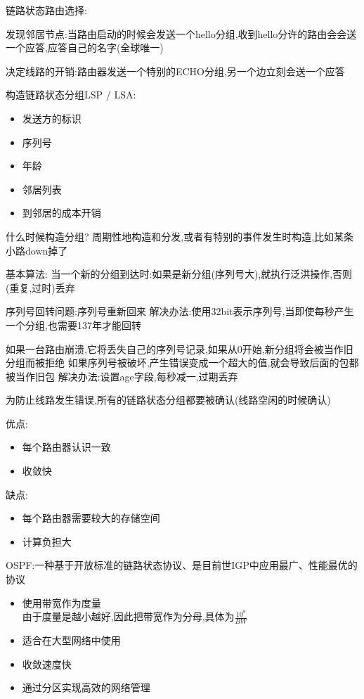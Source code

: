 \documentclass[UTF8,a4paper]{ctexart}
\begin{document}
链路状态路由选择:

发现邻居节点:当路由启动的时候会发送一个hello分组,收到hello分许的路由会会送一个应答,应答自己的名字(全球唯一)

决定线路的开销:路由器发送一个特别的ECHO分组,另一个边立刻会送一个应答

构造链路状态分组LSP / LSA:
\begin{itemize}
  \item 发送方的标识
  \item 序列号
  \item 年龄
  \item 邻居列表
  \item 到邻居的成本开销
\end{itemize}

什么时候构造分组?
周期性地构造和分发,或者有特别的事件发生时构造,比如某条小路down掉了

基本算法:
当一个新的分组到达时:如果是新分组(序列号大),就执行泛洪操作,否则(重复,过时)丢弃

序列号回转问题:序列号重新回来
解决办法:使用32bit表示序列号,当即使每秒产生一个分组,也需要137年才能回转

如果一台路由崩溃,它将丢失自己的序列号记录,如果从0开始,新分组将会被当作旧分组而被拒绝
如果序列号被破坏,产生错误变成一个超大的值,就会导致后面的包都被当作旧包
解决办法:设置age字段,每秒减一,过期丢弃

为防止线路发生错误,所有的链路状态分组都要被确认(线路空闲的时候确认)

优点:
\begin{itemize}
  \item 每个路由器认识一致
  \item 收敛快
\end{itemize}

缺点:
\begin{itemize}
  \item 每个路由器需要较大的存储空间
  \item 计算负担大
\end{itemize}

OSPF:一种基于开放标准的链路状态协议、是目前世IGP中应用最广、性能最优的协议
\begin{itemize}
  \item 使用带宽作为度量\\
  由于度量是越小越好,因此把带宽作为分母,具体为$\frac{10^8}{BW}$
  \item 适合在大型网络中使用
  \item 收敛速度快
  \item 通过分区实现高效的网络管理
\end{itemize}
\end{document}
